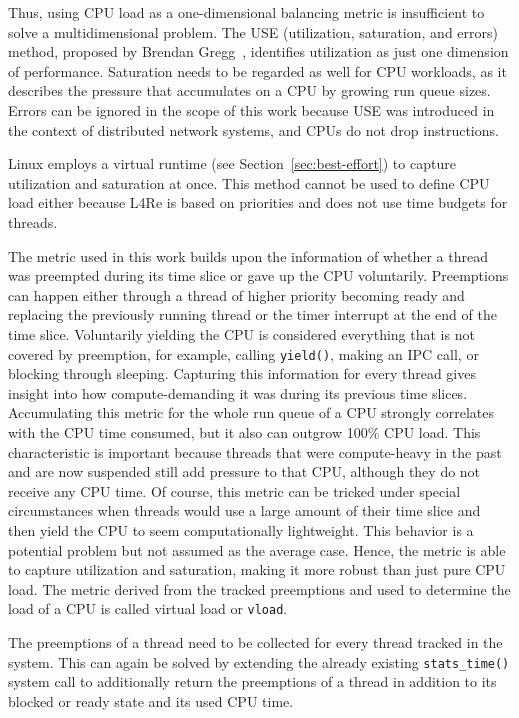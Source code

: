 Thus, using CPU load as a one-dimensional balancing metric is insufficient to solve a multidimensional problem.
The USE (utilization, saturation, and errors) method, proposed by Brendan Gregg~\cite{use_method_gregg}, identifies utilization as just one dimension of performance.
Saturation needs to be regarded as well for CPU workloads, as it describes the pressure that accumulates on a CPU by growing run queue sizes.
Errors can be ignored in the scope of this work because USE was introduced in the context of distributed network systems, and CPUs do not drop instructions.

Linux employs a virtual runtime (see Section~\ref{sec:best-effort}) to capture utilization and saturation at once.
This method cannot be used to define CPU load either because L4Re is based on priorities and does not use time budgets for threads.

The metric used in this work builds upon the information of whether a thread was preempted during its time slice or gave up the CPU voluntarily.
Preemptions can happen either through a thread of higher priority becoming ready and replacing the previously running thread or the timer interrupt at the end of the time slice.  
Voluntarily yielding the CPU is considered everything that is not covered by preemption, for example, calling \texttt{yield()}, making an IPC call, or blocking through sleeping.
Capturing this information for every thread gives insight into how compute-demanding it was during its previous time slices.
Accumulating this metric for the whole run queue of a CPU strongly correlates with the CPU time consumed, but it also can outgrow 100\% CPU load.
This characteristic is important because threads that were compute-heavy in the past and are now suspended still add pressure to that CPU, although they do not receive any CPU time.
Of course, this metric can be tricked under special circumstances when threads would use a large amount of their time slice and then yield the CPU to seem computationally lightweight.
This behavior is a potential problem but not assumed as the average case.
Hence, the metric is able to capture utilization and saturation, making it more robust than just pure CPU load.
The metric derived from the tracked preemptions and used to determine the load of a CPU is called virtual load or \texttt{vload}.

The preemptions of a thread need to be collected for every thread tracked in the system.
This can again be solved by extending the already existing \texttt{stats\_time()} system call to additionally return the preemptions of a thread in addition to its blocked or ready state and its used CPU time.

